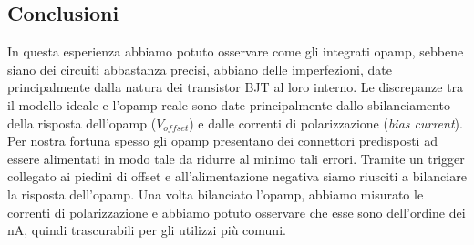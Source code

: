 \subsection{Conclusioni}
In questa esperienza abbiamo potuto osservare come gli integrati opamp, sebbene siano dei circuiti abbastanza precisi, abbiano delle imperfezioni, date principalmente dalla natura dei transistor BJT al loro interno.
Le discrepanze tra il modello ideale e l'opamp reale sono date principalmente dallo sbilanciamento della risposta dell'opamp ($V_{offset}$) e dalle correnti di polarizzazione (\textit{bias current}).
Per nostra fortuna spesso gli opamp presentano dei connettori predisposti ad essere alimentati in modo tale da ridurre al minimo tali errori.
Tramite un trigger collegato ai piedini di offset e all'alimentazione negativa siamo riusciti a bilanciare la risposta dell'opamp.
Una volta bilanciato l'opamp, abbiamo misurato le correnti di polarizzazione e abbiamo potuto osservare che esse sono dell'ordine dei \si{\nano\ampere}, quindi trascurabili per gli utilizzi più comuni.
